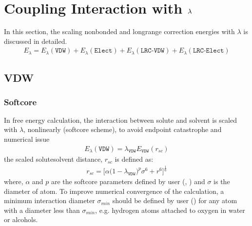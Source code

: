 \documentclass[letterpaper,10pt,english]{sphinxmanual}
\begin{document}
\chapter{Coupling Interaction with \protect\(\lambda\protect\)}
\label{\detokenize{free_energy:coupling-interaction-with-lambda}}\label{\detokenize{free_energy::doc}}
In this section, the scaling nonbonded and long\sphinxhyphen{}range correction energies with \(\lambda\) is discussed in detailed.
\begin{equation*}
\begin{split}E_{\lambda} = E_{\lambda}(\texttt{VDW}) + E_{\lambda}(\texttt{Elect}) + E_{\lambda}(\texttt{LRC-VDW}) + E_{\lambda}(\texttt{LRC-Elect})\end{split}
\end{equation*}

\section{VDW}
\label{\detokenize{free_energy:vdw}}

\subsection{Soft\sphinxhyphen{}core}
\label{\detokenize{free_energy:soft-core}}
In free energy calculation, the  interaction between solute and solvent is scaled with \(\lambda\), non\sphinxhyphen{}linearly (soft\sphinxhyphen{}core scheme), to avoid
end\sphinxhyphen{}point catastrophe and numerical issue
\begin{equation*}
\begin{split}E_{\lambda}(\texttt{VDW}) = \lambda_{\texttt{VDW}} E_{\texttt{VDW}}(r_{sc})\end{split}
\end{equation*}
the scaled solute\sphinxhyphen{}solvent distance, \(r_{sc}\) is defined as:
\begin{equation*}
\begin{split}r_{sc} = \bigg[\alpha {\big(1 - \lambda_{\texttt{VDW}} \big)}^{p}{\sigma}^6 + {r}^6 \bigg]^{\frac{1}{6}}\end{split}
\end{equation*}
where, \(\alpha\) and \(p\) are the soft\sphinxhyphen{}core parameters defined by user (, ) and \(\sigma\) is the diameter of atom.
To improve numerical convergence of the calculation, a minimum interaction diameter \(\sigma_{min}\) should be defined by user () for any atom with a diameter
less than \(\sigma_{min}\), e.g. hydrogen atoms attached to oxygen in water or alcohols.
\end{document}
